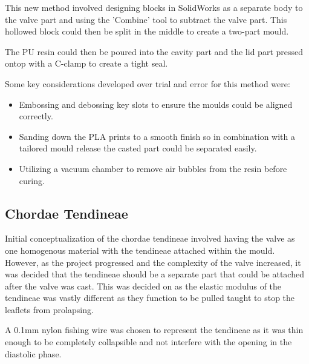This new method involved designing blocks in SolidWorks as a separate body to the valve part and using the 'Combine' tool to subtract the valve part. This hollowed block could then be split in the middle to create a two-part mould.

The \gls{PU} resin could then be poured into the cavity part and the lid part pressed ontop with a C-clamp to create a tight seal.

Some key considerations developed over trial and error for this method were:

\begin{itemize}
    \item Embossing and debossing key slots to ensure the moulds could be aligned correctly.
    \item Sanding down the \gls{PLA} prints to a smooth finish so in combination with a tailored mould release the casted part could be separated easily.
    \item Utilizing a vacuum chamber to remove air bubbles from the resin before curing.
\end{itemize}


\subsection{Chordae Tendineae }
Initial conceptualization of the chordae tendineae involved having the valve as one homogenous material with the tendineae attached within the mould. However, as the project progressed and the complexity of the valve increased, it was decided that the tendineae should be a separate part that could be attached after the valve was cast. This was decided on as the elastic modulus of the tendineae was vastly different as they function to be pulled taught to stop the leaflets from prolapsing.

A 0.1mm nylon fishing wire was chosen to represent the tendineae as it was thin enough to be completely collapsible and not interfere with the opening in the diastolic phase.

